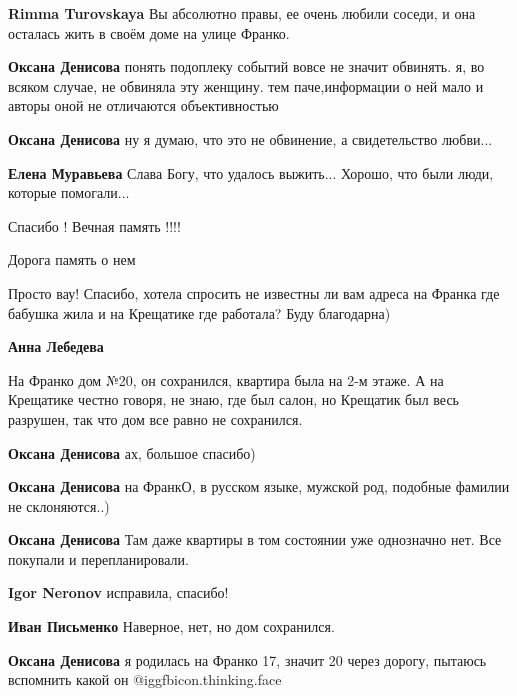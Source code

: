 \begin{itemize}
\begin{itemize}
\begin{itemize}
\textbf{Rimma Turovskaya} Вы абсолютно правы, ее очень любили соседи, и она осталась жить в своём доме на улице Франко.

\textbf{Оксана Денисова} понять подоплеку событий вовсе не значит обвинять. я, во всяком случае, не обвиняла эту женщину. тем паче,информации о ней мало и авторы оной не отличаются объективностью

\textbf{Оксана Денисова} ну я думаю, что это не обвинение, а свидетельство любви...
\end{itemize} %

\textbf{Елена Муравьева} Слава Богу, что удалось выжить... Хорошо, что были люди, которые помогали...

Спасибо !
Вечная память !!!!

\end{itemize} %

Дорога память о нем


Просто вау! Спасибо, хотела спросить не известны ли вам адреса на Франка где
бабушка жила и на Крещатике где работала? Буду благодарна)

\begin{itemize} %
\textbf{Анна Лебедева} 

На Франко дом №20, он сохранился, квартира была на 2-м этаже. А на Крещатике
честно говоря, не знаю, где был салон, но Крещатик был весь разрушен, так что
дом все равно не сохранился.

\begin{itemize} %
\textbf{Оксана Денисова} ах, большое спасибо)

\textbf{Оксана Денисова} на ФранкО, в русском языке, мужской род, подобные фамилии не склоняются..)

\textbf{Оксана Денисова} Там даже квартиры в том состоянии уже однозначно нет. Все покупали и перепланировали.

\textbf{Igor Neronov} исправила, спасибо!

\textbf{Иван Письменко} Наверное, нет, но дом сохранился.

\textbf{Оксана Денисова} я родилась на Франко 17, значит 20 через дорогу, пытаюсь вспомнить какой он @igg{fbicon.thinking.face} 


\end{itemize}
\end{itemize}
\end{itemize}
